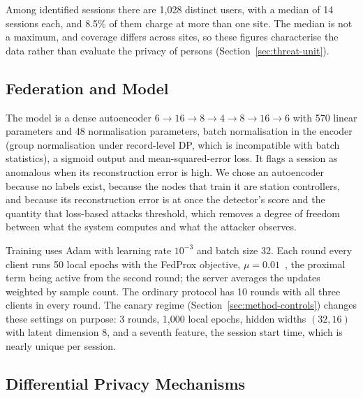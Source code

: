 Among identified sessions there are 1{,}028 distinct users, with a median of
14 sessions each, and 8.5\% of them charge at more than one site. The median
is not a maximum, and coverage differs across sites, so these figures
characterise the data rather than evaluate the privacy of persons
(Section~\ref{sec:threat-unit}).

\subsection{Federation and Model}
\label{sec:system-model}

The model is a dense autoencoder $6 \rightarrow 16 \rightarrow 8 \rightarrow 4
\rightarrow 8 \rightarrow 16 \rightarrow 6$ with 570 linear parameters and 48
normalisation parameters, batch normalisation in the encoder (group
normalisation under record-level DP, which is incompatible with batch
statistics), a sigmoid output and mean-squared-error loss. It flags a session
as anomalous when its reconstruction error is high. We chose an autoencoder
because no labels exist, because the nodes that train it are station
controllers, and because its reconstruction error is at once the detector's
score and the quantity that loss-based attacks threshold, which removes a
degree of freedom between what the system computes and what the attacker
observes.

Training uses Adam with learning rate $10^{-3}$ and batch size 32. Each round
every client runs 50 local epochs with the FedProx objective, $\mu =
0.01$~\cite{li2020fedprox}, the proximal term being active from the second
round; the server averages the updates weighted by sample count. The ordinary
protocol has 10 rounds with all three clients in every round. The canary
regime (Section~\ref{sec:method-controls}) changes these settings on purpose:
3 rounds, 1{,}000 local epochs, hidden widths $(32,16)$ with latent dimension
8, and a seventh feature, the session start time, which is nearly unique per
session.

\subsection{Differential Privacy Mechanisms}
\label{sec:system-dp}

